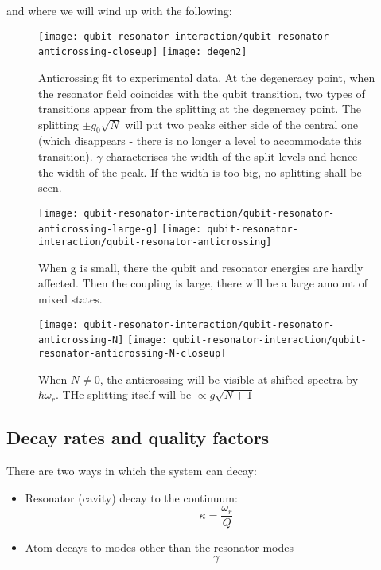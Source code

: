 \noindent and where we will wind up with the following:

\begin{figure}[h]
  \centering
  \texttt{[image: qubit-resonator-interaction/qubit-resonator-anticrossing-closeup]}
  \texttt{[image: degen2]}
  \caption{\small  Anticrossing  fit to  experimental  data.   At the  degeneracy
    point,  when the  resonator field  coincides with  the qubit  transition, two
    types of transitions appear from the  splitting at the degeneracy point.  The
    splitting $ \pm g_0\sqrt{N}  $ will put two peaks either  side of the central
    one  (which disappears  - there  is  no longer  a level  to accommodate  this
    transition).  $ \gamma $ characterises the width of the split levels and hence the
    width  of  the  peak.  If  the  width  is  too  big, no  splitting  shall  be
    seen.\label{fig:qubit-resonator-anticrossing-closeup}}
\end{figure}

\begin{figure}[h]
  \centering
  \texttt{[image: qubit-resonator-interaction/qubit-resonator-anticrossing-large-g]}
  \texttt{[image: qubit-resonator-interaction/qubit-resonator-anticrossing]}
  \caption{\small When  g is small,  there the  qubit and resonator  energies are
    hardly affected. Then the coupling is large,  there will be a large amount of
    mixed states. \label{fig:qubit-resonator-anticrossing}}
\end{figure}

\begin{figure}[h]
  \centering
  \texttt{[image: qubit-resonator-interaction/qubit-resonator-anticrossing-N]}
  \texttt{[image: qubit-resonator-interaction/qubit-resonator-anticrossing-N-closeup]}
  \caption{\small  When $N  \ne 0$,  the anticrossing  will be  visible at  shifted
    spectra by $\hbar\omega_r$.  THe splitting itself will be $ \propto g\sqrt{N+1} $}
\end{figure}


\subsection{Decay rates and quality factors}
\label{sec:decay-rates-quality}

There are two ways in which the system can decay:

\begin{itemize}
\item Resonator (cavity) decay to the continuum:
  \begin{equation}
    \kappa = \frac{\omega_{r}}{Q}
  \end{equation}

\item Atom decays to modes other than the resonator modes
  \begin{equation}
    \gamma
  \end{equation}
\end{itemize}

